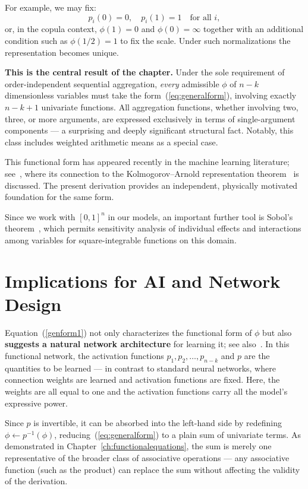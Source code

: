 For example, we may fix:
\[
p_i(0)=0,\quad p_i(1)=1\quad\text{for all }i,
\]
or, in the copula context, $\phi(1)=0$ and $\phi(0)=\infty$ together with an additional condition such as $\phi(1/2)=1$ to fix the scale.  Under such normalizations the representation becomes unique.

\textbf{This is the central result of the chapter.} Under the sole requirement of
order-independent sequential aggregation, \emph{every} admissible $\phi$ of $n-k$
dimensionless variables must take the form~(\ref{eq:generalform}), involving exactly
$n-k+1$ univariate functions. All aggregation functions, whether involving two, three,
or more arguments, are expressed exclusively in terms of single-argument components —
a surprising and deeply significant structural fact. Notably, this class includes
weighted arithmetic means as a special case.

This functional form has appeared recently in the machine learning literature;
see~\cite{liu2025kan}, where its connection to the Kolmogorov–Arnold representation
theorem~\cite{kolmogorov1956,kolmogorov1957,braun2009} is discussed. The present
derivation provides an independent, physically motivated foundation for the same form.

Since we work with $[0,1]^n$ in our models, an important further tool is Sobol's
theorem~\cite{Sobol1969,Sobol2001}, which permits sensitivity analysis of individual
effects and interactions among variables for square-integrable functions on this domain.

\section{Implications for AI and Network Design}\label{sec:ai_implications}

Equation~(\ref{genform1}) not only characterizes the functional form of $\phi$
but also \textbf{suggests a natural network architecture} for learning it; see
also~\cite{Castillo:98,CASTILLOG:98,CASTILLOCGP:99,CastilloCGP:00,CASTILLOHLP:08}.
In this functional network, the activation functions $p_1, p_2, \ldots, p_{n-k}$ and
$p$ are the quantities to be learned — in contrast to standard neural networks, where
connection weights are learned and activation functions are fixed. Here, the weights
are all equal to one and the activation functions carry all the model's expressive
power.

Since $p$ is invertible, it can be absorbed into the left-hand side by redefining
$\phi \leftarrow p^{-1}(\phi)$, reducing~(\ref{eq:generalform}) to a plain sum of
univariate terms. As demonstrated in Chapter~\ref{ch:functionalequations}, the sum
is merely one representative of the broader class of associative operations — any
associative function (such as the product) can replace the sum without affecting the
validity of the derivation.

